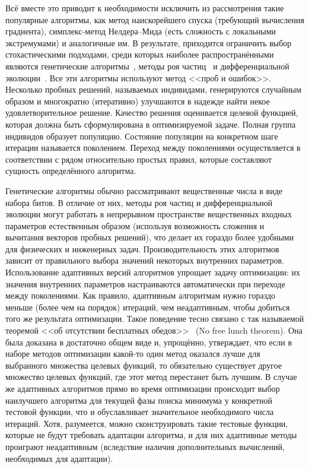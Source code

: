 Всё вместе это приводит к необходимости исключить из рассмотрения
такие популярные алгоритмы, как метод наискорейшего спуска (требующий
вычисления градиента), симплекс-метод Нелдера--Мида (есть сложность с
локальными экстремумами) и аналогичные им. В результате, приходится
ограничить выбор стохастическими подходами, среди которых наиболее
распространёнными являются генетические
алгоритмы~\cite{Goldberg-GA-1989}, методы  роя
частиц~\cite{Kennedy-PSO-1995} и дифференциальной
эволюции~\cite{Storn-DE-first-1997}.  Все эти алгоритмы используют
метод <<проб и ошибок>>.  Несколько пробных решений, называемых
индивидами, генерируются случайным образом и многократно (итеративно)
улучшаются в надежде найти некое удовлетворительное решение. Качество
решения оценивается целевой функцией, которая должна быть
сформулирована в оптимизируемой задаче.  Полная группа индивидов
образует популяцию.  Состояние популяции на конкретном шаге итерации
называется поколением.  Переход между поколениями осуществляется в
соответствии с рядом относительно простых правил, которые составляют
сущность определённого алгоритма.

Генетические алгоритмы обычно рассматривают вещественные числа в виде
набора битов.  В отличие от них, методы роя частиц и дифференциальной
эволюции могут работать в непрерывном пространстве вещественных
входных параметров естественным образом (используя возможность
сложения и вычитания векторов пробных решений), что делает их гораздо
более удобными для физических и инженерных задач.  Производительность
этих алгоритмов зависит от правильного выбора значений некоторых
внутренних параметров.  Использование адаптивных версий алгоритмов
упрощает задачу оптимизации: их значения внутренних параметров
настраиваются автоматически при переходе между поколениями. Как
правило, адаптивным алгоритмам нужно гораздо меньше (более чем на
порядок) итераций, чем неадаптивным, чтобы добиться того же результата
оптимизации. Такое поведение тесно связано с так называемой теоремой
<<об отсутствии бесплатных обедов>>~\cite{Wolpert-NFL-1997} (No free
lunch theorem). Она была доказана в достаточно общем виде и,
упрощённо, утверждает, что если в наборе методов оптимизации какой-то
один метод оказался лучше для выбранного множества целевых функций, то
обязательно существует другое множество целевых функций, где этот метод
перестанет быть лучшим. В случае же адаптивных алгоритмов прямо во
время оптимизации происходит выбор наилучшего алгоритма для текущей
фазы поиска минимума у конкретной тестовой функции, что и обуславливает
 значительное необходимого числа итераций. Хотя, разумеется,
можно сконструировать такие тестовые функции, которые не будут
требовать адаптации алгоритма, и для них адаптивные методы 
проиграют неадаптивным (вследствие наличия дополнительных
вычислений, необходимых для адаптации).

